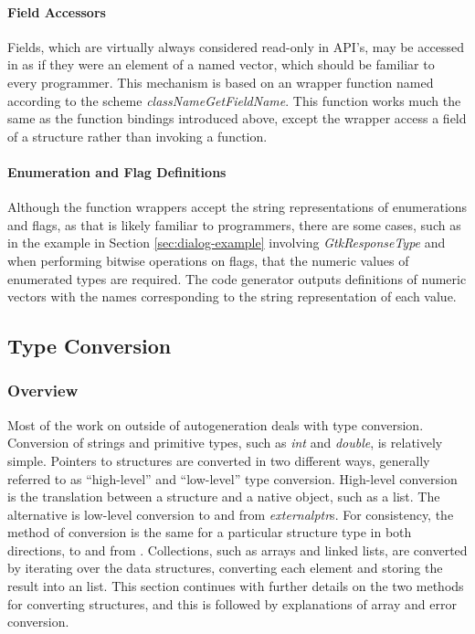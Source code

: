 \documentclass[article]{jss}
\begin{document}
\paragraph{Field Accessors}

Fields, which are virtually always considered read-only in  API's, 
may be accessed in  as if they were an element of a named vector,
which should be familiar to every  programmer. This mechanism
is based on an  wrapper function named according to the scheme
\emph{classNameGetFieldName}. This function works much the same as the 
function bindings introduced above, except the  wrapper
access a field of a  structure rather than invoking a function.

\paragraph{Enumeration and Flag Definitions}

Although the function wrappers accept the string representations of enumerations 
and flags, as that is likely familiar to  programmers, there are
some cases, such as in the example in Section \ref{sec:dialog-example} involving 
\emph{GtkResponseType} and when performing bitwise operations on flags, that the
numeric values of enumerated types are required. The code generator outputs 
definitions of  numeric vectors with the names corresponding to the
string representation of each value.

\subsection{Type Conversion}

\subsubsection{Overview}

Most of the work on  outside of autogeneration deals with type 
conversion. Conversion of strings and primitive  types, such as \emph{int} and 
\emph{double}, is relatively simple. Pointers to  structures are converted
in two different ways, generally referred to as ``high-level''
and ``low-level'' type conversion. High-level conversion is the translation
between a  structure and a native  object, such as a list. 
The alternative is low-level conversion to and from
 \emph{externalptr}s. For consistency, the method of conversion is 
the same for a particular structure type in both directions, to and from .
Collections, such as arrays and linked 
lists, are converted by iterating over the data structures, converting each
element and storing the result into an  list. This section continues
with further details on the two methods for converting 
structures, and this is followed by explanations of array and error conversion.
\end{document}
